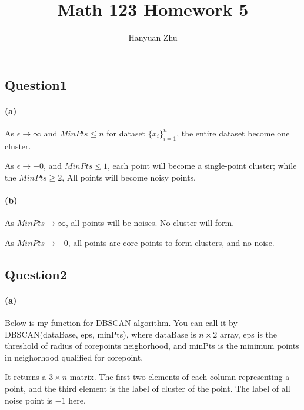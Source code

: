 \documentclass{article}
\title{Math 123 Homework 5}
\author{Hanyuan Zhu}
\begin{document}
\maketitle

\subsection*{Question1}

\paragraph{(a)}

As $\epsilon \rightarrow \infty$ and $MinPts \leq n$ for dataset $ \{x_i\}^n_{i=1}$, the entire dataset become one cluster.

As $\epsilon \rightarrow +0$, and $MinPts \leq 1$, each point will become a single-point cluster; while the $MinPts \geq 2$, All points will become noisy points.

\paragraph{(b)}

As $MinPts \rightarrow \infty$, all points will be noises. No cluster will form.

As $MinPts \rightarrow +0$, all points are core points to form clusters, and no noise.



\subsection*{Question2}

\paragraph{(a)} Below is my function for DBSCAN algorithm. You can call it by DBSCAN(dataBase, eps, minPts), where dataBase is $n \times 2$ array, eps is the threshold of radius of corepoints neighorhood, and minPts is the minimum points in neighorhood qualified for corepoint.

It returns a $3 \times n$ matrix. The first two elements of each column representing a point, and the third element is the label of cluster of the point. The label of all noise point is $-1$ here.
\end{document}
